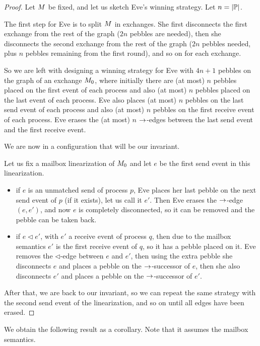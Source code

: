 \documentclass{article}
\begin{document}
\begin{proof}
Let $M$ be fixed, and let us sketch Eve's winning strategy.
Let $n = |\mathbb{P}|$.

The first step for Eve is to split $M$ in exchanges. She first disconnects
the first exchange from the rest of the graph ($2n$ pebbles are needed),
then she disconnects the second exchange from the rest of the graph ($2n$ pebbles needed, plus $n$ pebbles remaining from the first round), and so on for
each exchange.

So we are left with designing a winning strategy for Eve with $4n+1$ pebbles
on the graph of an exchange $M_0$,
where initially there are (at most) $n$ pebbles
placed on the first event of each process and also (at most) $n$ pebbles placed
on the last event of each process. Eve also places (at most) $n$ pebbles on the last
send event of each process and also (at most) $n$ pebbles on the first receive event of
each process. Eve erases the (at most) $n$ $\to$-edges between the last send event and the first receive event.

We are now in a configuration that will be our invariant.

Let us fix a mailbox linearization of $M_0$
and let $e$ be the first send event in this linearization.
\begin{itemize}
\item if $e$ is an unmatched send of process $p$,
Eve places her last pebble on the next
send event of $p$ (if it exists), let us call it $e'$. Then Eve erases the
$\to$-edge $(e,e')$, and now $e$ is completely disconnected,
so it can be removed and the pebble can be taken back.
\item if $e\lhd e'$, with $e'$ a receive event of process $q$,
then due to the mailbox semantics $e'$ is the first receive event of $q$,
so it has a pebble placed on it. Eve removes the $\lhd$-edge between
$e$ and $e'$, then using the extra pebble she disconnects $e$ and places a
pebble on the $\to$-successor of $e$, then she also
disconnects $e'$ and places a pebble on the $\to$-successor of $e'$.
\end{itemize}
After that, we are back to our invariant, so we can repeat the same
strategy with the second send event of the linearization, and so on until
all edges have been erased.
\end{proof}

We obtain the following result as a corollary.
Note that it assumes the mailbox semantics.
\end{document}
